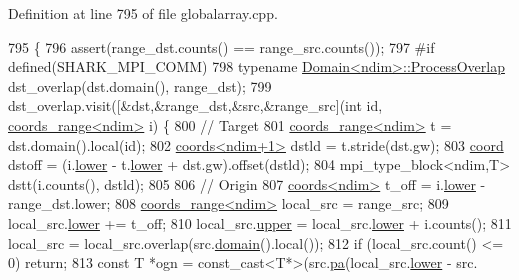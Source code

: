 Definition at line 795 of file globalarray.\+cpp.


\begin{DoxyCode}
795                                                                                                            
                              \{
796     assert(range\_dst.counts() == range\_src.counts());
797 \textcolor{preprocessor}{#if defined(SHARK\_MPI\_COMM)}
798     \textcolor{keyword}{typename} \hyperlink{classshark_1_1ndim_1_1_domain_1_1_process_overlap}{Domain<ndim>::ProcessOverlap} dst\_overlap(dst.domain(), range\_dst);
799     dst\_overlap.visit([&dst,&range\_dst,&src,&range\_src](\textcolor{keywordtype}{int} \textcolor{keywordtype}{id}, 
      \hyperlink{structshark_1_1ndim_1_1coords__range}{coords\_range<ndim>} i) \{
800             \textcolor{comment}{// Target}
801             \hyperlink{structshark_1_1ndim_1_1coords__range}{coords\_range<ndim>} t = dst.domain().local(\textcolor{keywordtype}{id});
802             \hyperlink{structshark_1_1ndim_1_1coords}{coords<ndim+1>} dstld = t.stride(dst.gw);
803             \hyperlink{namespaceshark_a767a92d5dd82cb82266473bff42fa6d9}{coord} dstoff = (i.\hyperlink{structshark_1_1ndim_1_1coords__range_a46cae2c424d7b20f911a970c92581b19}{lower} - t.\hyperlink{structshark_1_1ndim_1_1coords__range_a46cae2c424d7b20f911a970c92581b19}{lower} + dst.gw).offset(dstld);
804             mpi\_type\_block<ndim,T> dstt(i.counts(), dstld);
805 
806             \textcolor{comment}{// Origin}
807             \hyperlink{structshark_1_1ndim_1_1coords}{coords<ndim>} t\_off = i.\hyperlink{structshark_1_1ndim_1_1coords__range_a46cae2c424d7b20f911a970c92581b19}{lower} - range\_dst.lower;  
808             \hyperlink{structshark_1_1ndim_1_1coords__range}{coords\_range<ndim>} local\_src = range\_src;
809             local\_src.\hyperlink{structshark_1_1ndim_1_1coords__range_a46cae2c424d7b20f911a970c92581b19}{lower} += t\_off;
810             local\_src.\hyperlink{structshark_1_1ndim_1_1coords__range_ae0101e4bb3ecadf1faa0fc786dfb05db}{upper} = local\_src.\hyperlink{structshark_1_1ndim_1_1coords__range_a46cae2c424d7b20f911a970c92581b19}{lower} + i.counts();
811             local\_src = local\_src.overlap(src.\hyperlink{classshark_1_1ndim_1_1_global_array_a435ee8ff23c3feadf2ef2be64d4f375c}{domain}().local());
812             \textcolor{keywordflow}{if} (local\_src.count() <= 0) \textcolor{keywordflow}{return};
813             \textcolor{keyword}{const} T *ogn = \textcolor{keyword}{const\_cast<}T*\textcolor{keyword}{>}(src.\hyperlink{classshark_1_1ndim_1_1_global_array_a31a8a5247cc8adbe0602a83de759d915}{pa}(local\_src.\hyperlink{structshark_1_1ndim_1_1coords__range_a46cae2c424d7b20f911a970c92581b19}{lower} - src.

\end{DoxyCode}
